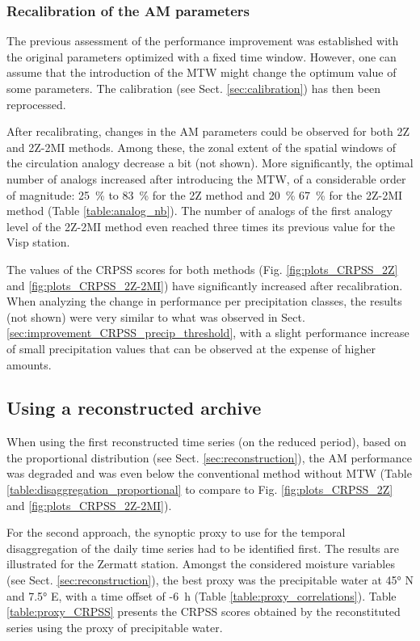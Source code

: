 \documentclass[hess, manuscript]{copernicus}
\begin{document}
\subsubsection{Recalibration of the AM parameters}
\label{sec:recalibration}

The previous assessment of the performance improvement was established with the original parameters optimized with a fixed time window. However, one can assume that the introduction of the MTW might change the optimum value of some parameters. The calibration (see Sect. \ref{sec:calibration}) has then been reprocessed.

After recalibrating, changes in the AM parameters could be observed for both 2Z and 2Z-2MI methods. Among these, the zonal extent of the spatial windows of the circulation analogy decrease a bit (not shown). More significantly, the optimal number of analogs increased after introducing the MTW, of a considerable order of magnitude: 25~\% to 83~\% for the 2Z method and 20~\% 67~\% for the 2Z-2MI method (Table \ref{table:analog_nb}). The number of analogs of the first analogy level of the 2Z-2MI method even reached three times its previous value for the Visp station. 

The values of the CRPSS scores for both methods (Fig. \ref{fig:plots_CRPSS_2Z} and \ref{fig:plots_CRPSS_2Z-2MI}) have significantly increased after recalibration. When analyzing the change in performance per precipitation classes, the results (not shown) were very similar to what was observed in Sect. \ref{sec:improvement_CRPSS_precip_threshold}, with a slight performance increase of small precipitation values that can be observed at the expense of higher amounts.


\subsection{Using a reconstructed archive}
\label{sec:reconstruction_results}

When using the first reconstructed time series (on the reduced period), based on the proportional distribution (see Sect. \ref{sec:reconstruction}), the AM performance was degraded and was even below the conventional method without MTW (Table \ref{table:disaggregation_proportional} to compare to Fig. \ref{fig:plots_CRPSS_2Z} and \ref{fig:plots_CRPSS_2Z-2MI}).

For the second approach, the synoptic proxy to use for the temporal disaggregation of the daily time series had to be identified first. The results are illustrated for the Zermatt station. Amongst the considered moisture variables (see Sect. \ref{sec:reconstruction}), the best proxy was the precipitable water at 45° N and 7.5° E, with a time offset of -6~h (Table \ref{table:proxy_correlations}). Table \ref{table:proxy_CRPSS} presents the CRPSS scores obtained by the reconstituted series using the proxy of precipitable water.
\end{document}
